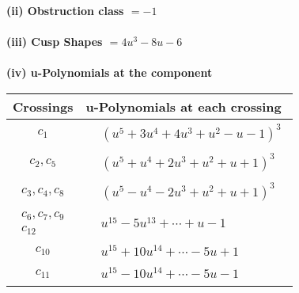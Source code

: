 \documentclass[1p]{elsarticle_modified}
\theoremstyle{definition}
\begin{document}
\flushleft \textbf{(ii) Obstruction class $= -1$}\\~\\
\flushleft \textbf{(iii) Cusp Shapes $= 4 u^3-8 u-6$}\\~\\
\newpage\renewcommand{\arraystretch}{1}
\flushleft \textbf{(iv) u-Polynomials at the component}\newline \\
\begin{tabular}{m{50pt}|m{274pt}}
Crossings & \hspace{64pt}u-Polynomials at each crossing \\
\hline $$\begin{aligned}c_{1}\end{aligned}$$&$\begin{aligned}
&(u^5+3 u^4+4 u^3+u^2- u-1)^3
\end{aligned}$\\
\hline $$\begin{aligned}c_{2},c_{5}\end{aligned}$$&$\begin{aligned}
&(u^5+u^4+2 u^3+u^2+u+1)^3
\end{aligned}$\\
\hline $$\begin{aligned}c_{3},c_{4},c_{8}\end{aligned}$$&$\begin{aligned}
&(u^5- u^4-2 u^3+u^2+u+1)^3
\end{aligned}$\\
\hline $$\begin{aligned}c_{6},c_{7},c_{9}\\c_{12}\end{aligned}$$&$\begin{aligned}
&u^{15}-5 u^{13}+\cdots+u-1
\end{aligned}$\\
\hline $$\begin{aligned}c_{10}\end{aligned}$$&$\begin{aligned}
&u^{15}+10 u^{14}+\cdots-5 u+1
\end{aligned}$\\
\hline $$\begin{aligned}c_{11}\end{aligned}$$&$\begin{aligned}
&u^{15}-10 u^{14}+\cdots-5 u-1
\end{aligned}$\\
\hline
\end{tabular}\\~\\
\end{document}
